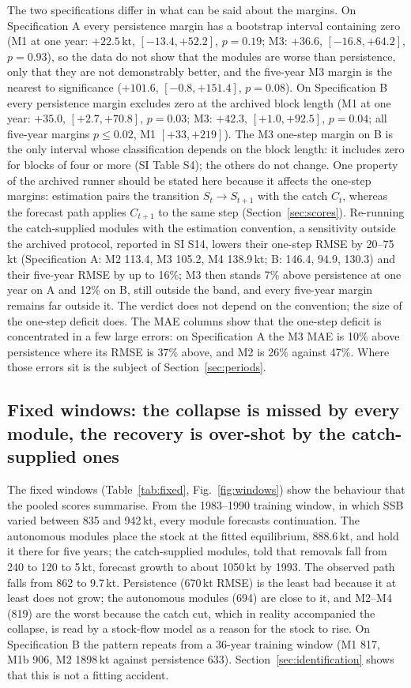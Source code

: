 \documentclass[preprint,11pt,authoryear]{elsarticle}
\theoremstyle{definition}
\theoremstyle{remark}
\newcommand{\kt}{\,\mathrm{kt}}
\begin{document}
The two specifications differ in what can be said about the margins. On Specification A every persistence margin has a bootstrap interval containing zero (M1 at one year: $+22.5\kt$, $[-13.4, +52.2]$, $p=0.19$; M3: $+36.6$, $[-16.8, +64.2]$, $p=0.93$), so the data do not show that the modules are worse than persistence, only that they are not demonstrably better, and the five-year M3 margin is the nearest to significance ($+101.6$, $[-0.8, +151.4]$, $p=0.08$). On Specification B every persistence margin excludes zero at the archived block length (M1 at one year: $+35.0$, $[+2.7, +70.8]$, $p=0.03$; M3: $+42.3$, $[+1.0, +92.5]$, $p=0.04$; all five-year margins $p\le 0.02$, M1 $[+33, +219]$). The M3 one-step margin on B is the only interval whose classification depends on the block length: it includes zero for blocks of four or more (SI Table S4); the others do not change. One property of the archived runner should be stated here because it affects the one-step margins: estimation pairs the transition $S_t\to S_{t+1}$ with the catch $C_t$, whereas the forecast path applies $C_{t+1}$ to the same step (Section~\ref{sec:scores}). Re-running the catch-supplied modules with the estimation convention, a sensitivity outside the archived protocol, reported in SI S14, lowers their one-step RMSE by 20--75\,kt (Specification A: M2 113.4, M3 105.2, M4 138.9\,kt; B: 146.4, 94.9, 130.3) and their five-year RMSE by up to 16\%; M3 then stands 7\% above persistence at one year on A and 12\% on B, still outside the band, and every five-year margin remains far outside it. The verdict does not depend on the convention; the size of the one-step deficit does. The MAE columns show that the one-step deficit is concentrated in a few large errors: on Specification A the M3 MAE is 10\% above persistence where its RMSE is 37\% above, and M2 is 26\% against 47\%. Where those errors sit is the subject of Section~\ref{sec:periods}.

\FloatBarrier
\subsection{Fixed windows: the collapse is missed by every module, the recovery is over-shot by the catch-supplied ones}\label{sec:fixed}

The fixed windows (Table~\ref{tab:fixed}, Fig.~\ref{fig:windows}) show the behaviour that the pooled scores summarise. From the 1983--1990 training window, in which SSB varied between 835 and 942\,kt, every module forecasts continuation. The autonomous modules place the stock at the fitted equilibrium, 888.6\,kt, and hold it there for five years; the catch-supplied modules, told that removals fall from 240 to 120 to 5\,kt, forecast growth to about 1050\,kt by 1993. The observed path falls from 862 to 9.7\,kt. Persistence (670\,kt RMSE) is the least bad because it at least does not grow; the autonomous modules (694) are close to it, and M2--M4 (819) are the worst because the catch cut, which in reality accompanied the collapse, is read by a stock-flow model as a reason for the stock to rise. On Specification B the pattern repeats from a 36-year training window (M1 817, M1b 906, M2 1898\,kt against persistence 633). Section~\ref{sec:identification} shows that this is not a fitting accident.
\end{document}
